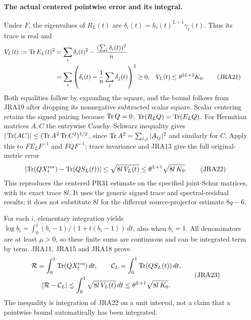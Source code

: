 \paragraph{The actual centered pointwise error and its integral.}
Under $F$, the eigenvalues of $R_L(t)$ are
$\delta_i(t)=h_i(t)^{L+1}\gamma_i(t)$. Thus its trace is real and
\begin{align}
 V_L(t):=\operatorname{Tr} E_L(t)^2
 &=\sum_i\delta_i(t)^2-\frac{(\sum_i\delta_i(t))^2}{n}\notag\\
 &=\sum_i\left(\delta_i(t)-\frac1n\sum_j\delta_j(t)\right)^2\geq0,
 &V_L(t)&\leq\theta^{2L+2}K_0.
 \tag{JRA21}
\end{align}
Both equalities follow by expanding the square, and the bound follows
from JRA19 after dropping its nonnegative subtracted scalar square.
Scalar centering retains the signed pairing because $\operatorname{Tr} Q=0$:
$\operatorname{Tr}(R_LQ)=\operatorname{Tr}(E_LQ)$. For Hermitian matrices $A,C$ the entrywise
Cauchy--Schwarz inequality gives
$|\operatorname{Tr}(AC)|\leq(\operatorname{Tr} A^2\operatorname{Tr} C^2)^{1/2}$, since
$\operatorname{Tr} A^2=\sum_{i,j}|A_{ij}|^2$ and similarly for $C$.
Apply this to $FE_LF^{-1}$ and $FQF^{-1}$; trace invariance and JRA13 give
the full original-metric error
\begin{equation}
 \left|\operatorname{Tr}(QX_t^{\rm res})-\operatorname{Tr}(QS_L(t))\right|
 \leq\sqrt{8l\,V_L(t)}
 \leq\theta^{L+1}\sqrt{8l\,K_0}.
 \tag{JRA22}
\end{equation}
This reproduces the centered PR31 estimate on the specified joint-Schur
matrices, with its exact trace $8l$. It uses the generic signed trace
and spectral-residual results; it does not substitute $8l$ for the
different source-projector estimate $8q-6$.

For each $i$, elementary integration yields
$\log b_i=\int_0^1(b_i-1)/(1+t(b_i-1))\,dt$, also when $b_i=1$.
All denominators are at least $\mu>0$, so these finite sums are continuous
and can be integrated term by term. JRA11, JRA15 and JRA18 prove
\begin{equation}
\begin{gathered}
 \mathcal R=\int_0^1\operatorname{Tr}(QX_t^{\rm res})\,dt,\qquad
 \mathcal C_L=\int_0^1\operatorname{Tr}(QS_L(t))\,dt,\\
 |\mathcal R-\mathcal C_L|
 \leq\int_0^1\sqrt{8l\,V_L(t)}\,dt
 \leq\theta^{L+1}\sqrt{8l\,K_0}.
\end{gathered}
 \tag{JRA23}
\end{equation}
The inequality is integration of JRA22 on a unit interval, not a
claim that a pointwise bound automatically has been integrated.

